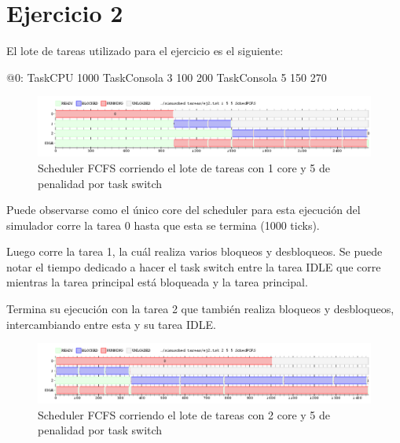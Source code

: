 \documentclass[a4paper,10pt,twoside]{article}
\newenvironment{pseudo}[1][]{%
    \vspace{0.5em}%
    \begin{algorithmic}%
}
{%
    \end{algorithmic}%
    \vspace{0.5em}%
}
\begin{document}
\newpage




\tableofcontents

\newpage



\section{Ejercicio 2}
El lote de tareas utilizado para el ejercicio es el siguiente:
\begin{pseudo}
	\State @0:
	\State TaskCPU 1000
	\State TaskConsola 3 100 200
	\State TaskConsola 5 150 270
\end{pseudo}

\begin{figure}[ht!]
\centering
\includegraphics[width=175mm]{../ejercicio2/FCFS1Core.png}
\caption{Scheduler FCFS corriendo el lote de tareas con 1 core y 5 de penalidad por task switch}
\label{FCFS1Core}
\end{figure}

Puede observarse como el único core del scheduler para esta ejecución del simulador corre la tarea 0 hasta que esta se termina (1000 ticks).

Luego corre la tarea 1, la cuál realiza varios bloqueos y desbloqueos. Se puede notar el tiempo dedicado a hacer el task switch entre la tarea IDLE que corre mientras la tarea principal está bloqueada y la tarea principal.

Termina su ejecución con la tarea 2 que también realiza bloqueos y desbloqueos, intercambiando entre esta y su tarea IDLE.

\begin{figure}[ht!]
\centering
\includegraphics[width=175mm]{../ejercicio2/FCFS2Core.png}
\caption{Scheduler FCFS corriendo el lote de tareas con 2 core y 5 de penalidad por task switch}
\label{FCFS2Core}
\end{figure}
\end{document}
